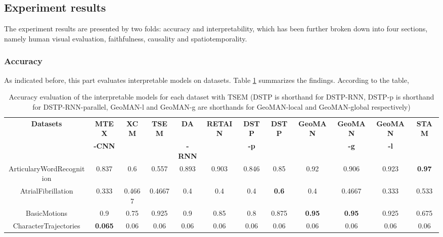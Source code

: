 \documentclass{svproc}
\begin{document}
\subsection{Experiment results}

The experiment results are presented by two folds: accuracy and interpretability, which has been further broken down into four sections, namely human visual evaluation, faithfulness, causality and spatiotemporality.
\subsubsection{Accuracy}
As indicated before, this part evaluates  interpretable models on  datasets. Table \ref{tab:ueaacc1} summarizes the findings. According to the table,
	\begin{table}[ht!]
    \caption{Accuracy evaluation of the interpretable models for each dataset with TSEM (DSTP is shorthand for DSTP-RNN, DSTP-p is shorthand for DSTP-RNN-parallel, GeoMAN-l and GeoMAN-g are shorthands for GeoMAN-local and GeoMAN-global respectively)}
    \centering
    \small\addtolength{\tabcolsep}{-6pt}
    \label{tab:ueaacc1}
    \begin{adjustbox}{width=1.3\textwidth}
    \begin{tabular}{||c@{\hskip 0.1in}c@{\hskip 0.1in}c@{\hskip 0.1in}c@{\hskip 0.1in}c@{\hskip 0.1in}c@{\hskip 0.1in}c@{\hskip 0.1in}c@{\hskip 0.1in}c@{\hskip 0.1in}c@{\hskip 0.1in}c@{\hskip 0.1in}c||} 
    \hline
    {\textbf{Datasets}} & \textbf{MTEX} &  {\textbf{XCM}} & {\textbf{TSEM}} & \textbf{DA} &  {\textbf{RETAIN}} & \textbf{DSTP} &  {\textbf{DSTP}} &  {\textbf{GeoMAN}} & \textbf{GeoMAN} & \textbf{GeoMAN} &  {\textbf{STAM}} \\ [0.5ex] 
    & \textbf{-CNN} & & & \textbf{-RNN} &  & \textbf{-p} &  &  & \textbf{-g} & \textbf{-l} &  \\ [0.5ex] 
    \hline\hline
    ArticularyWordRecognition &  0.837 & 0.6 & 0.557 & 0.893 & 0.903 & 0.846 & 0.85 & 0.92 & 0.906 & 0.923 & \textbf{0.97} \\ 
    \hline
    AtrialFibrillation &  0.333 & 0.4667 & 0.4667 & 0.4 & 0.4 & 0.4 & \textbf{0.6} & 0.4 & 0.4667 & 0.333 & 0.533 \\ 
    \hline
    BasicMotions &  0.9 & 0.75 & 0.925 & 0.9 & 0.85 & 0.8 & 0.875 & \textbf{0.95} & \textbf{0.95} & 0.925 & 0.675 \\ 
    \hline
    CharacterTrajectories &  \textbf{0.065} & 0.06 & 0.06 & 0.06 & 0.06 & 0.06 & 0.06 & 0.06 & 0.06 & 0.06 & 0.06 \\     \hline

\end{tabular}
\end{adjustbox}
\end{table}
\end{document}
